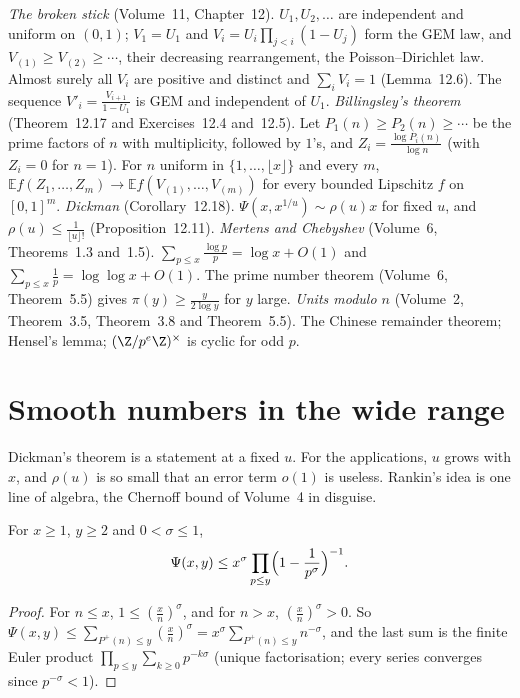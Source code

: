 \begin{reminder}
\emph{The broken stick} (Volume~11, Chapter~12). $U_1,U_2,\dots$ are independent and uniform on $(0,1)$; $V_1=U_1$ and $V_i=U_i\prod_{j<i}(1-U_j)$ form the GEM law, and $V_{(1)}\ge V_{(2)}\ge\cdots$, their decreasing rearrangement, the Poisson--Dirichlet law. Almost surely all $V_i$ are positive and distinct and $\sum_iV_i=1$ (Lemma~12.6). The sequence $V'_i=\frac{V_{i+1}}{1-U_1}$ is GEM and independent of $U_1$.
\emph{Billingsley's theorem} (Theorem~12.17 and Exercises~12.4 and~12.5). Let $P_1(n)\ge P_2(n)\ge\cdots$ be the prime factors of $n$ with multiplicity, followed by $1$'s, and $Z_i=\frac{\log P_i(n)}{\log n}$ (with $Z_i=0$ for $n=1$). For $n$ uniform in $\{1,\dots,\lfloor x\rfloor\}$ and every $m$, $\mathbb Ef(Z_1,\dots,Z_m)\to\mathbb Ef(V_{(1)},\dots,V_{(m)})$ for every bounded Lipschitz $f$ on $[0,1]^m$.
\emph{Dickman} (Corollary~12.18). $\Psi(x,x^{1/u})\sim\rho(u)x$ for fixed $u$, and $\rho(u)\le\frac1{\lfloor u\rfloor!}$ (Proposition~12.11).
\emph{Mertens and Chebyshev} (Volume~6, Theorems~1.3 and~1.5). $\sum_{p\le x}\frac{\log p}p=\log x+O(1)$ and $\sum_{p\le x}\frac1p=\log\log x+O(1)$. The prime number theorem (Volume~6, Theorem~5.5) gives $\pi(y)\ge\frac y{2\log y}$ for $y$ large.
\emph{Units modulo $n$} (Volume~2, Theorem~3.5, Theorem~3.8 and Theorem~5.5). The Chinese remainder theorem; Hensel's lemma; $(\Z/p^e\Z)^\times$ is cyclic for odd $p$.
\end{reminder}

\section{Smooth numbers in the wide range}\label{sec:rankin}

Dickman's theorem is a statement at a fixed $u$. For the applications, $u$ grows with $x$, and $\rho(u)$ is so small that an error term $o(1)$ is useless. Rankin's idea is one line of algebra, the Chernoff bound of Volume~4 in disguise.

\begin{proposition}\label{prop:rankin}
For $x\ge1$, $y\ge2$ and $0<\sigma\le1$,
\[
\Psi(x,y)\le x^\sigma\prod_{p\le y}\Bigl(1-\frac1{p^\sigma}\Bigr)^{-1}.
\]
\end{proposition}
\begin{proof}
For $n\le x$, $1\le(\frac xn)^\sigma$, and for $n>x$, $(\frac xn)^\sigma>0$. So
$\Psi(x,y)\le\sum_{P^+(n)\le y}(\frac xn)^\sigma=x^\sigma\sum_{P^+(n)\le y}n^{-\sigma}$, and the last sum is the finite Euler product $\prod_{p\le y}\sum_{k\ge0}p^{-k\sigma}$ (unique factorisation; every series converges since $p^{-\sigma}<1$).
\end{proof}

